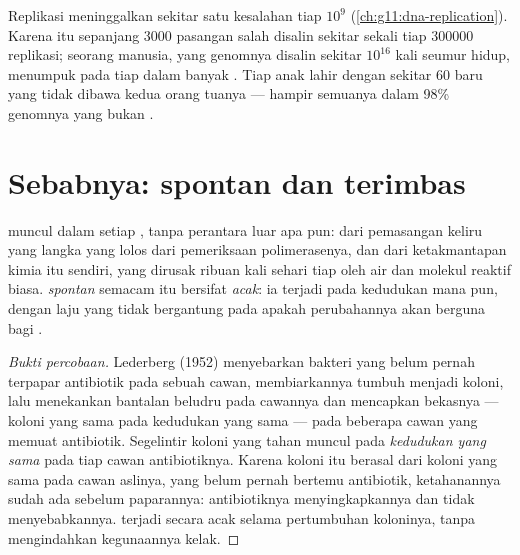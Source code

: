 \begin{example}\label{ex:g11:mutations:frequency}
Replikasi meninggalkan sekitar satu kesalahan tiap $10^9$ 
(\cref{ch:g11:dna-replication}). Karena itu  sepanjang $\num{3000}$
pasangan  salah disalin sekitar sekali tiap $\num{300000}$
replikasi; seorang manusia, yang genomnya disalin sekitar $10^{16}$
kali seumur hidup, menumpuk  pada tiap  dalam banyak . Tiap
anak lahir dengan sekitar 60  baru yang tidak dibawa kedua orang
tuanya --- hampir semuanya dalam 98\% genomnya yang bukan .
\end{example}

\section{Sebabnya: spontan dan terimbas}

\begin{proposition}\label{prop:g11:mutations:spontaneous}
 muncul dalam setiap , tanpa perantara luar apa pun: dari
pemasangan keliru yang langka yang lolos dari pemeriksaan polimerasenya,
dan dari ketakmantapan kimia  itu sendiri, yang  dirusak
ribuan kali sehari tiap  oleh air dan molekul reaktif 
biasa. \emph{ spontan} semacam itu bersifat \emph{acak}: ia
terjadi pada kedudukan mana pun, dengan laju yang tidak bergantung pada
apakah perubahannya akan berguna bagi .
\end{proposition}
\begin{proof}[Bukti percobaan]
Lederberg (1952) menyebarkan bakteri yang belum pernah terpapar
antibiotik pada sebuah cawan, membiarkannya tumbuh menjadi koloni, lalu
menekankan bantalan beludru pada cawannya dan mencapkan bekasnya ---
koloni yang sama pada kedudukan yang sama --- pada beberapa cawan yang
memuat antibiotik. Segelintir koloni yang tahan muncul pada
\emph{kedudukan yang sama} pada tiap cawan antibiotiknya. Karena
koloni itu berasal dari koloni yang sama pada cawan aslinya, yang
belum pernah bertemu antibiotik,  ketahanannya sudah ada sebelum
paparannya: antibiotiknya menyingkapkannya dan tidak menyebabkannya.
 terjadi secara acak selama pertumbuhan koloninya, tanpa
mengindahkan kegunaannya kelak.
\end{proof}

